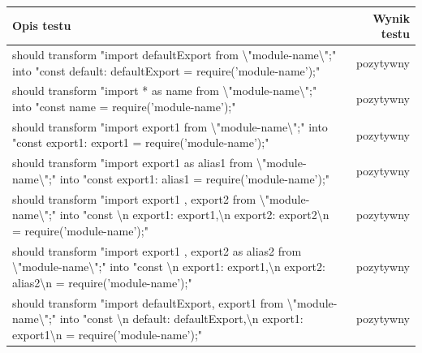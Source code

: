 \documentclass{SGGW-thesis}
\begin{document}
\begin{longtable}{@{\extracolsep{\fill}}|p{}|r|@{} }
    \hline
    \textbf{Opis testu}                                                                                                                                              & \textbf{Wynik testu} \\ \hline
    \endfirsthead
    \endhead
    should transform "import defaultExport from \textbackslash{}"module-name\textbackslash{}";" into "const {default: defaultExport} = require('module-name');"                                                                                                         & pozytywny            \\ \hline
    should transform "import * as name from \textbackslash{}"module-name\textbackslash{}";" into "const name = require('module-name');"                                                                                                                                 & pozytywny            \\ \hline
    should transform "import { export1 } from \textbackslash{}"module-name\textbackslash{}";" into "const {export1: export1} = require('module-name');"                                                                                                                 & pozytywny            \\ \hline
    should transform "import { export1 as alias1 } from \textbackslash{}"module-name\textbackslash{}";" into "const {export1: alias1} = require('module-name');"                                                                                                        & pozytywny            \\ \hline
    should transform "import { export1 , export2 } from \textbackslash{}"module-name\textbackslash{}";" into "const {\textbackslash{}n    export1: export1,\textbackslash{}n    export2: export2\textbackslash{}n} = require('module-name');"                           & pozytywny            \\ \hline
    should transform "import { export1 , export2 as alias2 } from \textbackslash{}"module-name\textbackslash{}";" into "const {\textbackslash{}n    export1: export1,\textbackslash{}n    export2: alias2\textbackslash{}n} = require('module-name');"                  & pozytywny            \\ \hline
    should transform "import defaultExport, { export1 } from \textbackslash{}"module-name\textbackslash{}";" into "const {\textbackslash{}n    default: defaultExport,\textbackslash{}n    export1: export1\textbackslash{}n} = require('module-name');"                & pozytywny            \\ \hline

\end{longtable}
\end{document}
